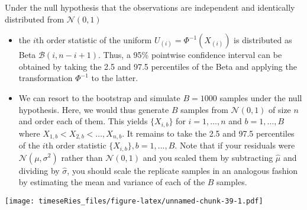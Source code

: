 \documentclass[]{book}
\newenvironment{Shaded}{\begin{snugshade}}{\end{snugshade}}
\newcommand{\DataTypeTok}[1]{\textcolor[rgb]{0.13,0.29,0.53}{#1}}
\newcommand{\DecValTok}[1]{\textcolor[rgb]{0.00,0.00,0.81}{#1}}
\newcommand{\KeywordTok}[1]{\textcolor[rgb]{0.13,0.29,0.53}{\textbf{#1}}}
\newcommand{\NormalTok}[1]{#1}
\newcommand{\OperatorTok}[1]{\textcolor[rgb]{0.81,0.36,0.00}{\textbf{#1}}}
\newcommand{\OtherTok}[1]{\textcolor[rgb]{0.56,0.35,0.01}{#1}}
\newcommand{\StringTok}[1]{\textcolor[rgb]{0.31,0.60,0.02}{#1}}
\providecommand{\tightlist}{%
  \setlength{\itemsep}{0pt}\setlength{\parskip}{0pt}}
\begin{document}
Under the null hypothesis that the observations are independent and
identically distributed from \(\mathcal{N}(0,1)\)

\begin{itemize}
\tightlist
\item
  the \(i\)th order statistic of the uniform
  \(U_{(i)}=\Phi^{-1}(X_{(i)})\) is distributed as Beta
  \(\mathcal{B}(i, n-i+1)\). Thus, a 95\% pointwise confidence interval
  can be obtained by taking the 2.5 and 97.5 percentiles of the Beta and
  applying the transformation \(\Phi^{-1}\) to the latter.
\item
  We can resort to the bootstrap and simulate \(B=1000\) samples under
  the null hypothesis. Here, we would thus generate \(B\) samples from
  \(\mathcal{N}(0,1)\) of size \(n\) and order each of them. This yields
  \(\{X_{i,b}\}\) for \(i=1, \ldots, n\) and \(b = 1, \ldots, B\) where
  \(X_{1,b} < X_{2, b} < \ldots, X_{n,b}\). It remains to take the 2.5
  and 97.5 percentiles of the \(i\)th order statistic
  \(\{X_{i, b}\}, b=1, \ldots, B\). Note that if your residuals were
  \(\mathcal{N}(\mu, \sigma^2)\) rather than \(\mathcal{N}(0,1)\) and
  you scaled them by subtracting \(\hat{\mu}\) and dividing by
  \(\hat{\sigma}\), you should scale the replicate samples in an
  analogous fashion by estimating the mean and variance of each of the
  \(B\) samples.
\end{itemize}

\begin{Shaded}
\end{Shaded}

\texttt{[image: timeseRies\_files/figure-latex/unnamed-chunk-39-1.pdf]}
\end{document}
